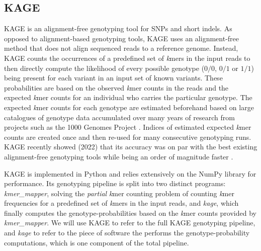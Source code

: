 \subsection{KAGE} \label{background:kage}
KAGE \cite{kage} is an alignment-free genotyping tool for SNPs and short indels.
As opposed to alignment-based genotyping tools, KAGE uses an alignment-free method that does not align sequenced reads to a reference genome.
Instead, KAGE counts the occurrences of a predefined set of \textit{k}mers in the input reads to then directly compute the likelihood of every possible genotype ($0/0$, $0/1$ or $1/1$) being present for each variant in an input set of known variants.
These probabilities are based on the observed \textit{k}mer counts in the reads and the expected \textit{k}mer counts for an individual who carries the particular genotype.
The expected \textit{k}mer counts for each genotype are estimated beforehand based on large catalogues of genotype data accumulated over many years of research from projects such as the 1000 Genomes Project \cite{1000_genomes_project}.
Indices of estimated expected \textit{k}mer counts are created once and then re-used for many consecutive genotyping runs.
KAGE recently showed (2022) that its accuracy was on par with the best existing alignment-free genotyping tools while being an order of magnitude faster \cite{kage}.

KAGE is implemented in Python and relies extensively on the NumPy library for performance.
Its genotyping pipeline is split into two distinct programs: \textit{kmer\_mapper}, solving the \textit{partial} \textit{k}mer counting problem of counting \textit{k}mer frequencies for a predefined set of \textit{k}mers in the input reads, and \textit{kage}, which finally computes the genotype-probabilities based on the \textit{k}mer counts provided by \textit{kmer\_mapper}.
We will use KAGE to refer to the full KAGE genotyping pipeline, and \textit{kage} to refer to the piece of software the performs the genotype-probability computations, which is one component of the total pipeline.

